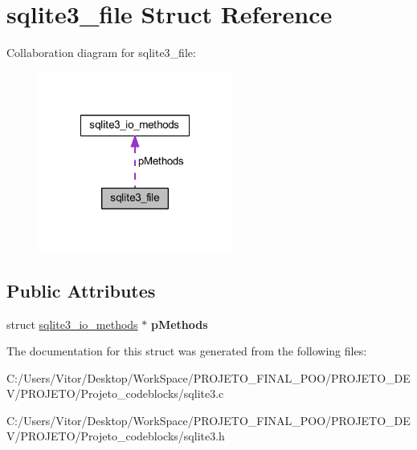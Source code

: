 \hypertarget{structsqlite3__file}{\section{sqlite3\-\_\-file Struct Reference}
\label{structsqlite3__file}
}


Collaboration diagram for sqlite3\-\_\-file\-:\nopagebreak
\begin{figure}[H]
\begin{center}
\leavevmode
\includegraphics[width=180pt]{structsqlite3__file__coll__graph}
\end{center}
\end{figure}
\subsection*{Public Attributes}
\begin{DoxyCompactItemize}
\item 
\hypertarget{structsqlite3__file_afb7c7beec15f0867d22f5260fcee24d3}{struct \hyperlink{structsqlite3__io__methods}{sqlite3\-\_\-io\-\_\-methods} $\ast$ {\bfseries p\-Methods}}\label{structsqlite3__file_afb7c7beec15f0867d22f5260fcee24d3}

\end{DoxyCompactItemize}


The documentation for this struct was generated from the following files\-:\begin{DoxyCompactItemize}
\item 
C\-:/\-Users/\-Vitor/\-Desktop/\-Work\-Space/\-P\-R\-O\-J\-E\-T\-O\-\_\-\-F\-I\-N\-A\-L\-\_\-\-P\-O\-O/\-P\-R\-O\-J\-E\-T\-O\-\_\-\-D\-E\-V/\-P\-R\-O\-J\-E\-T\-O/\-Projeto\-\_\-codeblocks/sqlite3.\-c\item 
C\-:/\-Users/\-Vitor/\-Desktop/\-Work\-Space/\-P\-R\-O\-J\-E\-T\-O\-\_\-\-F\-I\-N\-A\-L\-\_\-\-P\-O\-O/\-P\-R\-O\-J\-E\-T\-O\-\_\-\-D\-E\-V/\-P\-R\-O\-J\-E\-T\-O/\-Projeto\-\_\-codeblocks/sqlite3.\-h\end{DoxyCompactItemize}
